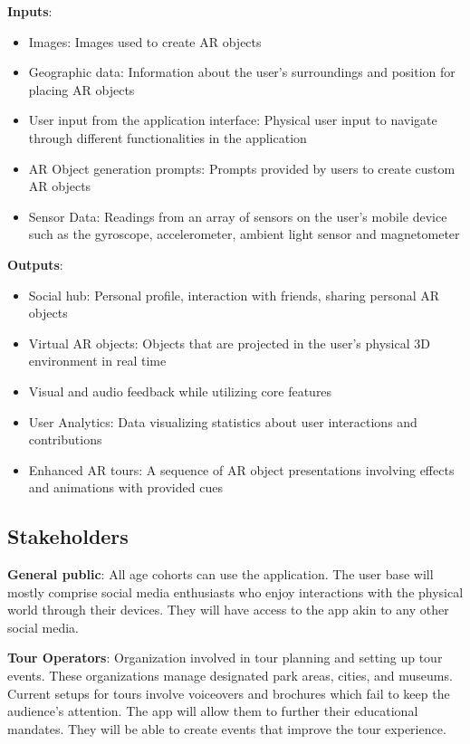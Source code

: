 \documentclass{article}
\begin{document}
\textbf{Inputs}:
\begin{itemize}
  \item Images: Images used to create AR objects
  \item Geographic data: Information about the user's surroundings and position for placing AR objects
  \item User input from the application interface: Physical user input to navigate through different functionalities in the application
  \item AR Object generation prompts: Prompts provided by users to create custom AR objects
  \item Sensor Data: Readings from an array of sensors on the user's mobile device such as the gyroscope, accelerometer, ambient light sensor and magnetometer
\end{itemize}

\begin{flushleft}
\textbf{Outputs}:
\end{flushleft}
\begin{itemize}
  \item Social hub: Personal profile, interaction with friends, sharing personal AR objects
  \item Virtual AR objects: Objects that are projected in the user's physical 3D environment in real time
  \item Visual and audio feedback while utilizing core features
  \item User Analytics: Data visualizing statistics about user interactions and contributions
  \item Enhanced AR tours: A sequence of AR object presentations involving effects and animations with provided cues
\end{itemize}

\subsection{Stakeholders}

\begin{flushleft}
 \textbf{General public}: All age cohorts can use the application. The user base will mostly comprise social media enthusiasts who enjoy interactions with the physical world through their devices. They will have access to the app akin to any other social media.\linebreak

 \textbf{Tour Operators}: Organization involved in tour planning and setting up tour events. These organizations manage designated park areas, cities, and museums. Current setups for tours involve voiceovers and brochures which fail to keep the audience's attention. The app will allow them to further their educational mandates. They will be able to create events that improve the tour experience.
\end{flushleft}
\end{document}
